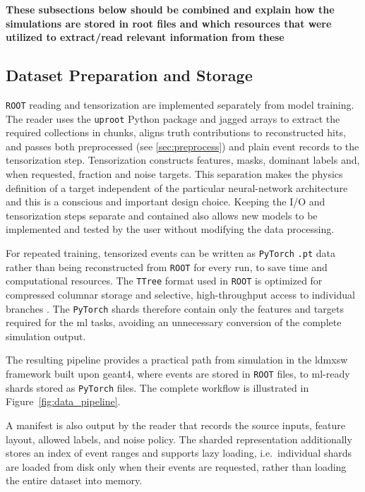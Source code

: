 \textbf{These subsections below should be combined and explain how the simulations are stored in root files and which resources that were utilized to extract/read relevant information from these}

\subsection{Dataset Preparation and Storage}
\label{sec:method_processing}

\texttt{ROOT} reading and tensorization are implemented separately from model training. The reader uses the \texttt{uproot} Python package \cite{uproot_software} and jagged arrays to extract the required
collections in chunks, aligns truth contributions to reconstructed hits, and
passes both preprocessed (see \ref{sec:preprocess}) and plain event records to the tensorization step. Tensorization constructs
features, masks, dominant labels and, when requested, fraction and noise
targets. This separation makes the physics definition of a target independent
of the particular neural-network architecture and 
this is a conscious and important
design choice. 
Keeping the I/O and tensorization steps separate and contained
also allows new models to be implemented and tested by the user without modifying the data processing.

For repeated training, tensorized events can be written as \texttt{PyTorch}
\texttt{.pt} data rather than being reconstructed from \texttt{ROOT} for every run, to save time and computational resources. The \texttt{TTree} format used in \texttt{ROOT} is optimized for compressed
columnar storage and selective, high-throughput access to individual branches
\cite{root_ttree}. The \texttt{PyTorch} shards therefore contain only the features and
targets required for the \gls{ml} tasks, avoiding an unnecessary conversion of
the complete simulation output.

The resulting pipeline provides a practical path from simulation in the
\gls{ldmxsw} framework built upon \gls{geant4}, where events are stored in \texttt{ROOT} files, to
\gls{ml}-ready shards stored as \texttt{PyTorch} files. The complete workflow is
illustrated in Figure~\ref{fig:data_pipeline}.

A manifest is also output by the reader that records the source inputs, feature
layout, allowed labels, and noise policy. The sharded representation
additionally stores an index of event ranges and supports lazy loading, i.e.\
individual shards are loaded from disk only when their events are requested,
rather than loading the entire dataset into memory.



